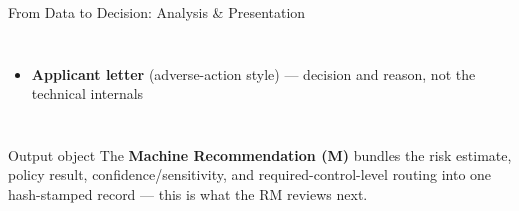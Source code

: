 \documentclass[9pt,aspectratio=169]{beamer}
\begin{document}
\begin{frame}{From Data to Decision: Analysis \& Presentation}
\begin{columns}[T]
\begin{itemize}
            Five C's, Peer Comparison, Improvement Pathways, AIRB Regulatory Detail, Credit Decision
      \item[\small$\bullet$] \textbf{Applicant letter} (adverse-action style) --- decision and
            reason, not the technical internals
    \end{itemize}
\end{columns}
\vspace{6pt}
\begin{alertblock}{Output object}
  \footnotesize
  The \textbf{Machine Recommendation (M)} bundles the risk estimate, policy result,
  confidence/sensitivity, and required-control-level routing into one hash-stamped record ---
  this is what the RM reviews next.
\end{alertblock}
\end{frame}
\end{document}
